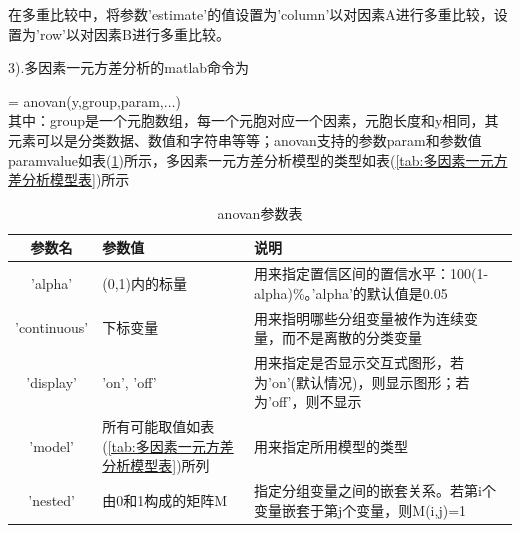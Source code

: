         \par
        在多重比较中，将参数'estimate'的值设置为'column'以对因素A进行多重比较，设置为'row'以对因素B进行多重比较。
        \par
        3).多因素一元方差分析的matlab命令为
        \par
        [p,table,stats,terms] = anovan(y,group,param,$\dots$)\\
        其中：group是一个元胞数组，每一个元胞对应一个因素，元胞长度和y相同，其元素可以是分类数据、数值和字符串等等；anovan支持的参数param和参数值paramvalue如表(\ref{tab:anovan参数表})所示，多因素一元方差分析模型的类型如表(\ref{tab:多因素一元方差分析模型表})所示
        \begin{table}[H]
        \caption{anovan参数表}
        \label{tab:anovan参数表}
        \begin{tabularx}{\textwidth}{|c|X|X|}%
        \toprule
         参数名& 参数值& 说明\\\midrule
        {'alpha'} & {(0,1)内的标量} & 用来指定置信区间的置信水平：100(1-alpha)\%。'alpha'的默认值是0.05\\\hline
        {'continuous' } & {下标变量} & 用来指明哪些分组变量被作为连续变量，而不是离散的分类变量\\\hline
        {'display'}  & {'on', 'off'} & 用来指定是否显示交互式图形，若为'on'(默认情况)，则显示图形；若为'off'，则不显示\\\hline
        'model' &所有可能取值如表(\ref{tab:多因素一元方差分析模型表})所列 & 用来指定所用模型的类型\\\hline
        {'nested'} & {由0和1构成的矩阵M} & 指定分组变量之间的嵌套关系。若第i个变量嵌套于第j个变量，则M(i,j)=1\\
        \bottomrule
        \end{tabularx}
        \end{table}

